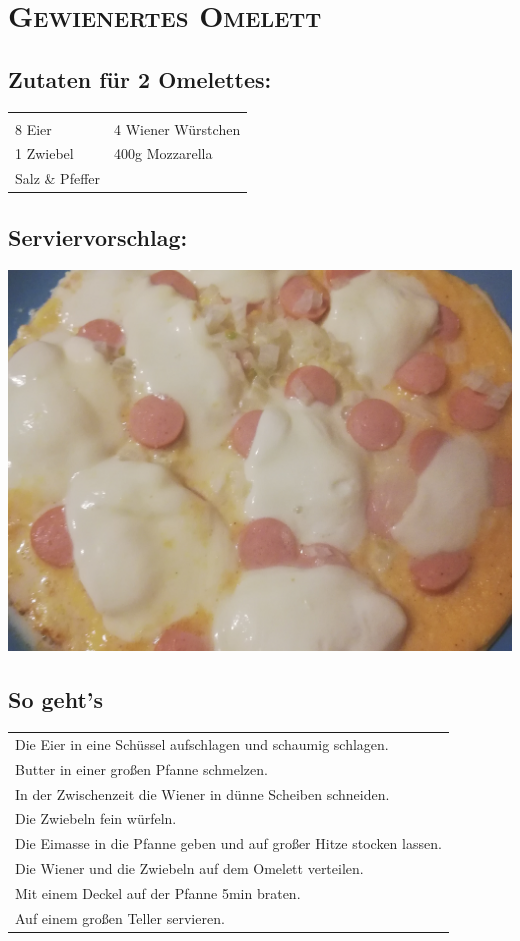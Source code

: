 \section{\textsc{Gewienertes Omelett}}

\subsection*{Zutaten für 2 Omelettes:}

\begin{tabular}{p{7.5cm} p{7.5cm}}
	& \\
	8 Eier & 4 Wiener Würstchen \\
	1 Zwiebel & 400g Mozzarella \\
	Salz \& Pfeffer &
\end{tabular}

\subsection*{Serviervorschlag:}

\includegraphics[width=\textwidth]{img/omlett/omlett_wiener_fertig.jpg} \cite{omlettwiener}

\subsection*{So geht's}

\begin{tabular}{p{15cm}}
	Die Eier in eine Schüssel aufschlagen und schaumig schlagen.\\
	Butter in einer großen Pfanne schmelzen.\\
	In der Zwischenzeit die Wiener in dünne Scheiben schneiden.\\
	Die Zwiebeln fein würfeln.\\
	Die Eimasse in die Pfanne geben und auf großer Hitze stocken lassen.\\
	Die Wiener und die Zwiebeln auf dem Omelett verteilen.\\
	Mit einem Deckel auf der Pfanne 5min braten.\\
	Auf einem großen Teller servieren.
\end{tabular}
